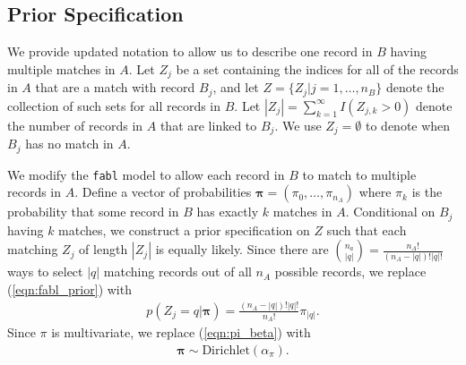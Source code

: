\documentclass[12pt,letterpaper]{article}
\newcommand{\1}[1]{\mathbb{I}\!\left[#1\right]} %
\begin{document}
\subsection{Prior Specification}\label{sec:prior-specification}

We provide updated notation to allow us to describe one record in $B$ having multiple matches in $A$. Let $Z_j$ be a set containing the indices for all of the records in $A$ that are a match with record $B_j$, and let $Z = \{Z_j | j = 1, \ldots, n_B\}$ denote the collection of such sets for all records in $B$. Let $|Z_j| = \sum_{k=1}^{\infty} I(Z_{j, k} > 0)$ denote the number of records in $A$ that are linked to $B_j$. We use $Z_j = \emptyset$ to denote when $B_j$ has no match in $A$.

We modify the \texttt{fabl} model to allow each record in $B$ to match to multiple records in $A$. Define a vector of probabilities $\bm{\pi} = (\pi_0, \ldots, \pi_{n_A})$ where $\pi_k$ is the probability that some record in $B$ has exactly $k$ matches in $A$. Conditional on $B_j$ having $k$ matches, we construct a prior specification on $Z$ such that each matching $Z_j$ of length $|Z_j|$ is equally likely. Since there are ${n_a \choose |q|} = \frac{n_A!}{(n_A - |q|)! |q|!}$ ways to select $|q|$ matching records out of all $n_A$ possible records, we replace (\ref{eqn:fabl_prior}) with
\begin{align}\label{eqn:z}
	p(Z_j = q| \bm{\pi}) = \frac{(n_A - |q|)! |q|!}{n_A!} \pi_{|q|}.
\end{align}
Since $\pi$ is multivariate, we replace (\ref{eqn:pi_beta}) with
\begin{align}
	\bm{\pi}\sim \text{Dirichlet}(\alpha_{\pi}).
\end{align}
\end{document}

